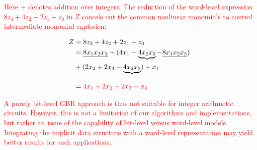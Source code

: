 \textcolor{red}{Here $+$ denotes addition over integers. The reduction
  of the word-level expression $8z_3 + 4z_2+2z_1+z_0$ in $Z$ cancels out the
  common nonlinear monomials to control intermediate monomial explosion: }

\textcolor{red}{\begin{align*}
Z &= 8z_3 + 4z_2+2z_1+z_0\\
  &=\underline{8x_1x_2x_3} + (4x_1 + \underbrace{4x_2x_3} -
  \underline{8x_1x_2x_3})\\
  & + (2x_2+2x_3-\underbrace{4x_2x_3}_{}) + x_4\\
  &=\textcolor{red}{4x_1 + 2x_2 + 2x_3 + x_4}
\end{align*}
}

\textcolor{red}{A purely
bit-level GBR approach is thus not suitable for integer arithmetic
circuits. However, this is not a limitation of our algorithms and
implementations, but rather an issue of the capability of bit-level
versus word-level models. Integrating the implicit data structure with
a word-level representation may yield better results for
such applications.} 





